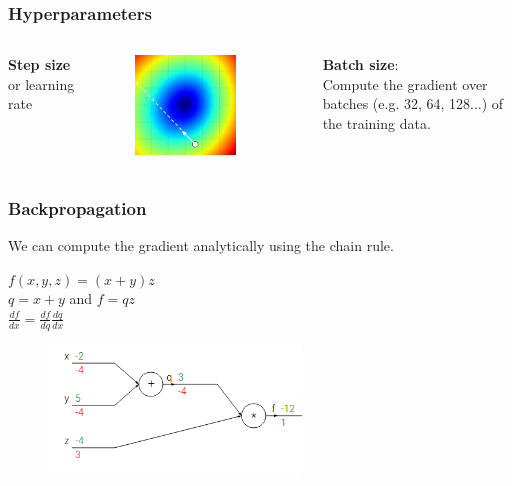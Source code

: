 \begin{frame}
	\frametitle{Hyperparameters}

	\begin{columns}
		\textbf{Step size} or learning rate
		\centering
		\begin{figure}
                	\includegraphics[width=0.8\textwidth]{Pics/stepsize.jpg}
        	\end{figure}
		\textbf{Batch size}:\\
		Compute the gradient over batches (e.g. 32, 64, 128...) of the 
		training data.
	\end{columns}

\end{frame}

\begin{frame}
	\frametitle{Backpropagation}

	\vskip 0.3cm
	We can compute the gradient analytically using the chain rule.

	\vskip 0.5cm

	\centering
	$f(x,y,z)=(x+y)z$\\
	$q=x+y$ and $f=qz$\\
	$\frac{df}{dx}=\frac{df}{dq}\frac{dq}{dx}$

        \begin{figure}
                \includegraphics[width=0.6\textwidth]{Pics/backpropagation}
        \end{figure}

\end{frame}


